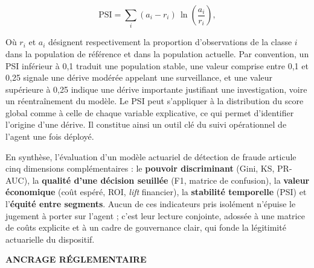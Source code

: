 \begin{equation}
    \text{PSI} = \sum_i (a_i - r_i) \, \ln \left( \frac{a_i}{r_i} \right),
\end{equation}

Où $r_i$ et $a_i$ désignent respectivement la proportion d'observations de la classe $i$ dans la population de référence et dans la population actuelle. Par convention, un PSI inférieur à 0,1 traduit une population stable, une valeur comprise entre 0,1 et 0,25 signale une dérive modérée appelant une surveillance, et une valeur supérieure à 0,25 indique une dérive importante justifiant une investigation, voire un réentraînement du modèle. Le PSI peut s'appliquer à la distribution du score global comme à celle de chaque variable explicative, ce qui permet d'identifier l'origine d'une dérive. Il constitue ainsi un outil clé du suivi opérationnel de l'agent une fois déployé.

En synthèse, l'évaluation d'un modèle actuariel de détection de fraude articule cinq dimensions complémentaires : le \textbf{pouvoir discriminant} (Gini, KS, PR-AUC), la \textbf{qualité d'une décision seuillée} (F1, matrice de confusion), la \textbf{valeur économique} (coût espéré, ROI, \textit{lift} financier), la \textbf{stabilité temporelle} (PSI) et l'\textbf{équité entre segments}. Aucun de ces indicateurs pris isolément n'épuise le jugement à porter sur l'agent ; c'est leur lecture conjointe, adossée à une matrice de coûts explicite et à un cadre de gouvernance clair, qui fonde la légitimité actuarielle du dispositif.

\vspace{1cm}

\begin{center}
    \textbf{ANCRAGE RÉGLEMENTAIRE}
\end{center}

\noindent{}
